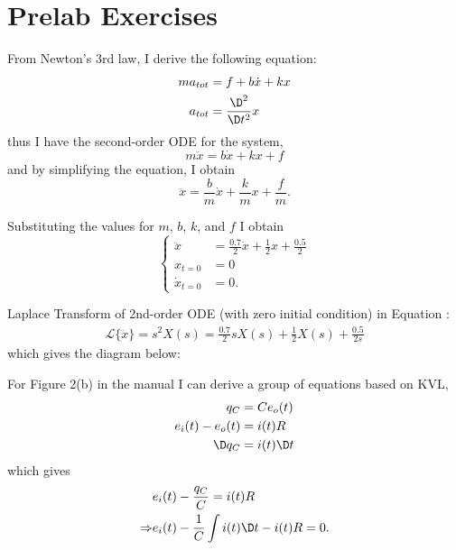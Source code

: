 

\def\LABNUMBER{1}
\def\LABTITLE{Analog Simulation}
\newcommand\K{\text{k}}



\makeMyTitle

\section{Prelab Exercises}

From Newton's 3rd law, I derive the following equation:
\begin{align*}
  ma_{tot} &= f + b\dot{x}+kx \\
  a_{tot} &= \frac{\D^2}{\D t^2} x
\end{align*}
thus I have the second-order ODE for the system,
\begin{equation*}
  m\ddot{x}=b\dot{x}+kx+f
\end{equation*}
and by simplifying the equation, I obtain
\begin{equation*}
  \ddot{x}=\frac{b}{m}\dot{x}+\frac{k}{m}x+\frac{f}{m}.
\end{equation*}

Substituting the values for $m$, $b$, $k$, and $f$ I obtain
\begin{equation}\label{eq-ode}
  \begin{cases}
    \ddot{x}&=\frac{0.7}{2}\dot{x}+\frac{1}{2}x+\frac{0.5}{2}\\
    x_{t=0} &= 0 \\
    \dot{x}_{t=0} &= 0.
  \end{cases}
\end{equation}



Laplace Transform of 2nd-order ODE (with zero initial condition) in Equation
:
\begin{align*}
  \mathcal{L}\lbrace {\ddot{x}} \rbrace = s^2 X(s)
                    = \frac{0.7}{2} sX(s) + \frac{1}{2} X(s) + \frac{0.5}{2s}
\end{align*}
which gives the diagram below:





For Figure 2(b) in the manual I can derive a group of equations based on KVL,
\begin{align}
   q_C &= Ce_o(t) \\
  e_i(t) - e_o(t) &= i(t)R \\
  \D q_C &= i(t)\D t
\end{align}
which gives
\begin{align*}
  &e_i(t) - \frac{q_C}{C} = i(t) R \\
\Rightarrow   &e_i(t) - \frac{1}{C}\int i(t)\D t- i(t)R = 0.
\end{align*}


